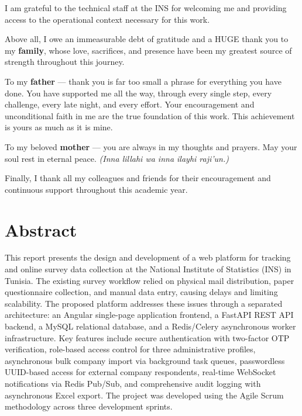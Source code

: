 \documentclass[12pt,a4paper]{report}
\begin{document}
I am grateful to the technical staff at the INS for welcoming me and providing access to the operational context necessary for this work.

\bigskip

Above all, I owe an immeasurable debt of gratitude and a HUGE thank you to my \textbf{family}, whose love, sacrifices, and presence have been my greatest source of strength throughout this journey.

To my \textbf{father} --- thank you is far too small a phrase for everything you have done. You have supported me all the way, through every single step, every challenge, every late night, and every effort. Your encouragement and unconditional faith in me are the true foundation of this work. This achievement is yours as much as it is mine.

To my beloved \textbf{mother} --- you are always in my thoughts and prayers. May your soul rest in eternal peace. \textit{(Inna lillahi wa inna ilayhi raji'un.)}

\bigskip

Finally, I thank all my colleagues and friends for their encouragement and continuous support throughout this academic year.


\clearpage
\chapter*{Abstract}

This report presents the design and development of a web platform for tracking and online survey data collection at the National Institute of Statistics (INS) in Tunisia. The existing survey workflow relied on physical mail distribution, paper questionnaire collection, and manual data entry, causing delays and limiting scalability. The proposed platform addresses these issues through a separated architecture: an Angular single-page application frontend, a FastAPI REST API backend, a MySQL relational database, and a Redis/Celery asynchronous worker infrastructure. Key features include secure authentication with two-factor OTP verification, role-based access control for three administrative profiles, asynchronous bulk company import via background task queues, passwordless UUID-based access for external company respondents, real-time WebSocket notifications via Redis Pub/Sub, and comprehensive audit logging with asynchronous Excel export. The project was developed using the Agile Scrum methodology across three development sprints.
\end{document}
